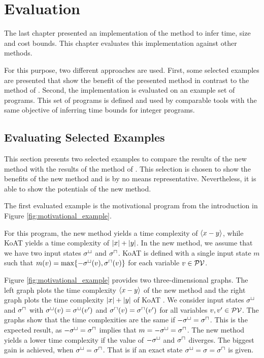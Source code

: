 \section{Evaluation}

The last chapter presented an implementation of the method to infer time, size and cost bounds.
This chapter evaluates this implementation against other methods.

For this purpose, two different approaches are used.
First, some selected examples are presented that show the benefit of the presented method in contrast to the method of \cite{koat}.
Second, the implementation is evaluated on an example set of programs.
This set of programs is defined and used by comparable tools with the same objective of inferring time bounds for integer programs.

\subsection{Evaluating Selected Examples}

This section presents two selected examples to compare the results of the new method with the results of the method of \cite{koat}.
This selection is chosen to show the benefits of the new method and is by no means representative.
Nevertheless, it is able to show the potentials of the new method.

The first evaluated example is the motivational program from the introduction in Figure \ref{fig:motivational_example}.



For this program, the new method yields a time complexity of $\langle x-y\rangle$, while KoAT \cite{koat} yields a time complexity of $\left|x\right|+\left|y\right|$.
In the new method, we assume that we have two input states ${\sigma^\sqcup}$ and ${\sigma^\sqcap}$.
KoAT \cite{koat} is defined with a single input state $m$ such that $m(v) = \max \lbrace -{\sigma^\sqcup}(v),{\sigma^\sqcap}(v) \rbrace$ for each variable $v \in \mathcal{PV}$.

Figure \ref{fig:motivational_example} provides two three-dimensional graphs.
The left graph plots the time complexity $\langle x-y\rangle$ of the new method and the right graph plots the time complexity $\left|x\right|+\left|y\right|$ of KoAT \cite{koat}.
We consider input states ${\sigma^\sqcup}$ and ${\sigma^\sqcap}$ with ${\sigma^\sqcup}(v) = {\sigma^\sqcup}(v')$ and ${\sigma^\sqcap}(v) = {\sigma^\sqcap}(v')$ for all variables $v, v' \in \mathcal{PV}$.
The graphs show that the time complexities are the same if $-{\sigma^\sqcup} = {\sigma^\sqcap}$.
This is the expected result, as $-{\sigma^\sqcup} = {\sigma^\sqcap}$ implies that $m = -{\sigma^\sqcup} = {\sigma^\sqcap}$.
The new method yields a lower time complexity if the value of $-{\sigma^\sqcup}$ and ${\sigma^\sqcap}$ diverges.
The biggest gain is achieved, when ${\sigma^\sqcup} = {\sigma^\sqcap}$.
That is if an exact state ${\sigma^\sqcup} = \sigma = {\sigma^\sqcap}$ is given.

